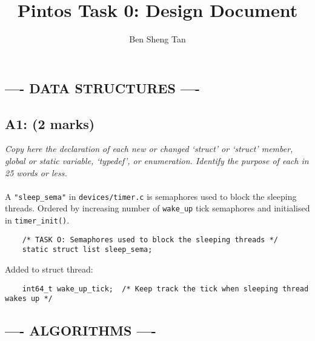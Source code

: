 \documentclass{article}
\title{Pintos Task 0: Design Document}
\author{Ben Sheng Tan}
\begin{document}
\maketitle

\subsection*{---- DATA STRUCTURES ----}

\subsection*{A1: (2 marks) }

\textit{Copy here the declaration of each new or changed ‘struct’ or ‘struct’ member, global or static variable, ‘typedef’, or enumeration. Identify the purpose of each in 25 words or less.}
\\ \\
A \texttt{"sleep\_sema"} in \texttt{devices/timer.c} is semaphores used to block the sleeping threads. Ordered by increasing number of \texttt{wake\_up} tick semaphores and initialised in \texttt{timer\_init()}.

\begin{lstlisting}
    /* TASK O: Semaphores used to block the sleeping threads */
    static struct list sleep_sema;
\end{lstlisting}
\hfill \break
Added to struct thread:

\begin{lstlisting}
    int64_t wake_up_tick;  /* Keep track the tick when sleeping thread wakes up */
\end{lstlisting}


\subsection*{---- ALGORITHMS ----}
\end{document}
